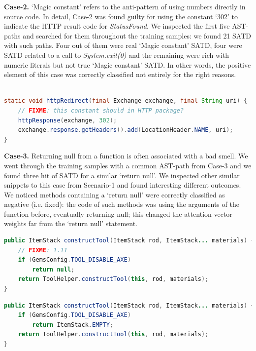 \textbf{Case-2.} `Magic constant' refers to the anti-pattern of using numbers directly in source code. In detail, Case-2 was found guilty for using the constant `302' to indicate the HTTP result code for \textit{StatusFound}. We inspected the first five AST-paths and searched for them throughout the training samples: we found 21 SATD with such paths. Four out of them were real `Magic constant' SATD, four were SATD related to a call to \textit{System.exit(0)} and the remaining were rich with numeric literals but not true `Magic constant' SATD. In other words, the positive element of this case was correctly classified not entirely for the right reasons.



\begin{lstlisting}[caption={Correctly detected SATD, verbatim Case-2}, label={lst:case_magic_constant},language=Java]

static void httpRedirect(final Exchange exchange, final String uri) {
    // FIXME: this constant should in HTTP package?
    httpResponse(exchange, 302);
    exchange.response.getHeaders().add(LocationHeader.NAME, uri);
}

\end{lstlisting}


\textbf{Case-3.} Returning null from a function is often associated with a bad smell. We went through the training samples with a common AST-path from Case-3 and we found three hit of SATD for a similar `return null'. We inspected other similar snippets to this case from Scenario-1 and found interesting different outcomes. We noticed methods containing a `return null' were correctly classified as negative (i.e. fixed): the code of such methods was using the arguments of the function before, eventually returning null; this changed the attention vector weights far from the `return null' statement. 


\begin{lstlisting}[caption={Case-3 SATD, verbatim source code}, label={lst:case3satd},language=Java]
public ItemStack constructTool(ItemStack rod, ItemStack... materials) {
    // FIXME: 1.11
    if (GemsConfig.TOOL_DISABLE_AXE)
        return null;
    return ToolHelper.constructTool(this, rod, materials);
}
\end{lstlisting}

\begin{lstlisting}[caption={Case-3 fixed, verbatim source code}, label={lst:case3fixed},language=Java]
public ItemStack constructTool(ItemStack rod, ItemStack... materials) {
    if (GemsConfig.TOOL_DISABLE_AXE)
        return ItemStack.EMPTY;
    return ToolHelper.constructTool(this, rod, materials);
}
\end{lstlisting}

